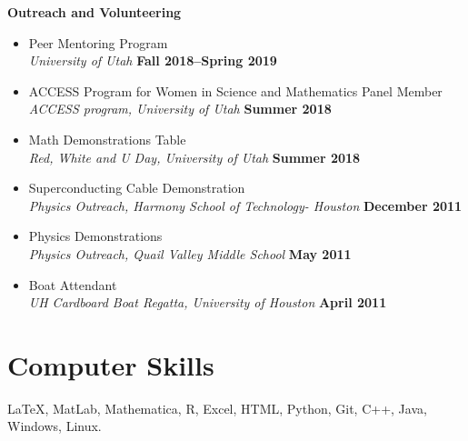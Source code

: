 \documentclass[margin,line]{res}
\begin{document}
\begin{resume}
{\bf Outreach and Volunteering}
\begin{itemize}
    \item[ ] Peer Mentoring Program
    \\ {\it University of Utah} \hfill {\bf Fall 2018--Spring 2019}
    \item[ ] ACCESS Program for Women in Science and Mathematics Panel Member 
    \\ {\it ACCESS program, University of Utah} \hfill {\bf Summer 2018}
    \item[ ] Math Demonstrations Table
    \\ {\it Red, White and U Day, University of Utah} \hfill {\bf Summer 2018}
    \item[ ] Superconducting Cable Demonstration
    \\ {\it Physics Outreach, Harmony School of Technology- Houston} \hfill {\bf December 2011}
    \item[ ] Physics Demonstrations
    \\ {\it Physics Outreach, Quail Valley Middle School} \hfill {\bf May 2011}
    \item[ ] Boat Attendant
    \\ {\it UH Cardboard Boat Regatta, University of Houston} \hfill {\bf April 2011}
\end{itemize}



\section{\sc Computer Skills} 
\LaTeX, MatLab, Mathematica, R, Excel, HTML, Python, Git, C++, Java, Windows, Linux.


\end{resume}
\end{document}
